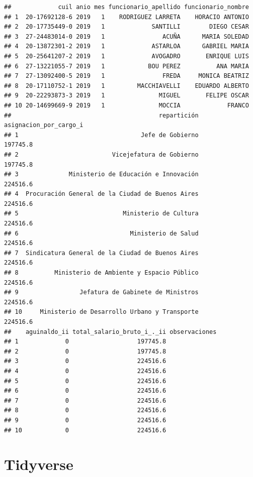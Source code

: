 \documentclass[]{book}
\begin{document}
\begin{verbatim}
##             cuil anio mes funcionario_apellido funcionario_nombre
## 1  20-17692128-6 2019   1    RODRIGUEZ LARRETA    HORACIO ANTONIO
## 2  20-17735449-0 2019   1             SANTILLI        DIEGO CESAR
## 3  27-24483014-0 2019   1                ACUÑA      MARIA SOLEDAD
## 4  20-13872301-2 2019   1             ASTARLOA      GABRIEL MARIA
## 5  20-25641207-2 2019   1             AVOGADRO       ENRIQUE LUIS
## 6  27-13221055-7 2019   1            BOU PEREZ          ANA MARIA
## 7  27-13092400-5 2019   1                FREDA     MONICA BEATRIZ
## 8  20-17110752-1 2019   1         MACCHIAVELLI    EDUARDO ALBERTO
## 9  20-22293873-3 2019   1               MIGUEL       FELIPE OSCAR
## 10 20-14699669-9 2019   1               MOCCIA             FRANCO
##                                         repartición asignacion_por_cargo_i
## 1                                  Jefe de Gobierno               197745.8
## 2                          Vicejefatura de Gobierno               197745.8
## 3              Ministerio de Educación e Innovación               224516.6
## 4  Procuración General de la Ciudad de Buenos Aires               224516.6
## 5                             Ministerio de Cultura               224516.6
## 6                               Ministerio de Salud               224516.6
## 7  Sindicatura General de la Ciudad de Buenos Aires               224516.6
## 8          Ministerio de Ambiente y Espacio Público               224516.6
## 9                 Jefatura de Gabinete de Ministros               224516.6
## 10     Ministerio de Desarrollo Urbano y Transporte               224516.6
##    aguinaldo_ii total_salario_bruto_i_._ii observaciones
## 1             0                   197745.8              
## 2             0                   197745.8              
## 3             0                   224516.6              
## 4             0                   224516.6              
## 5             0                   224516.6              
## 6             0                   224516.6              
## 7             0                   224516.6              
## 8             0                   224516.6              
## 9             0                   224516.6              
## 10            0                   224516.6
\end{verbatim}

\hypertarget{tidyverse}{%
\chapter{Tidyverse}\label{tidyverse}}
\end{document}
